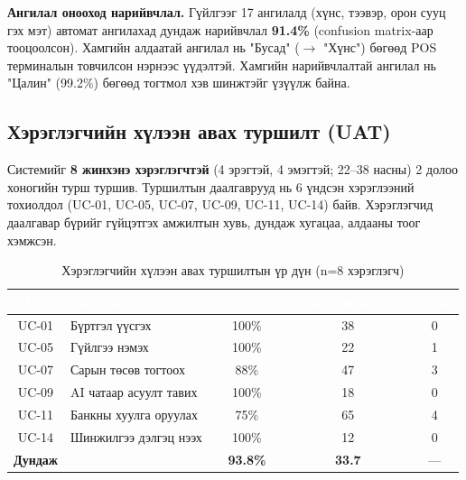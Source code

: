 \textbf{Ангилал онооход нарийвчлал.} Гүйлгээг 17 ангилалд (хүнс, тээвэр, орон сууц гэх мэт) автомат ангилахад дундаж нарийвчлал \textbf{91.4\%} (confusion matrix-аар тооцоолсон). Хамгийн алдаатай ангилал нь "Бусад" ($\rightarrow$ "Хүнс") бөгөөд POS терминалын товчилсон нэрнээс үүдэлтэй. Хамгийн нарийвчлалтай ангилал нь "Цалин" (99.2\%) бөгөөд тогтмол хэв шинжтэйг үзүүлж байна.

\subsection{Хэрэглэгчийн хүлээн авах туршилт (UAT)}
Системийг \textbf{8 жинхэнэ хэрэглэгчтэй} (4 эрэгтэй, 4 эмэгтэй; 22--38 насны) 2 долоо хоногийн турш туршив. Туршилтын даалгаврууд нь 6 үндсэн хэрэглээний тохиолдол (UC-01, UC-05, UC-07, UC-09, UC-11, UC-14) байв. Хэрэглэгчид даалгавар бүрийг гүйцэтгэх амжилтын хувь, дундаж хугацаа, алдааны тоог хэмжсэн.

\begin{table}[ht]
\centering
\footnotesize
\renewcommand{\arraystretch}{1.25}
\begin{tabular}{|c|p{4.5cm}|c|c|c|}
\hline
\rowcolor{darknavy}
\textcolor{white}{\textbf{UC}} &
\textcolor{white}{\textbf{Даалгавар}} &
\textcolor{white}{\textbf{Амжилт \%}} &
\textcolor{white}{\textbf{Дунд хугацаа (сек)}} &
\textcolor{white}{\textbf{Алдаа}} \\ \hline
UC-01 & Бүртгэл үүсгэх              & 100\% & 38  & 0 \\ \hline
UC-05 & Гүйлгээ нэмэх               & 100\% & 22  & 1 \\ \hline
UC-07 & Сарын төсөв тогтоох         & 88\%  & 47  & 3 \\ \hline
UC-09 & AI чатаар асуулт тавих      & 100\% & 18  & 0 \\ \hline
UC-11 & Банкны хуулга оруулах       & 75\%  & 65  & 4 \\ \hline
UC-14 & Шинжилгээ дэлгэц нээх       & 100\% & 12  & 0 \\ \hline
\rowcolor{accentgreen!30}
\textbf{Дундаж} & & \textbf{93.8\%} & \textbf{33.7} & --- \\ \hline
\end{tabular}
\caption{Хэрэглэгчийн хүлээн авах туршилтын үр дүн (n=8 хэрэглэгч)}
\label{tab:uat}
\end{table}

